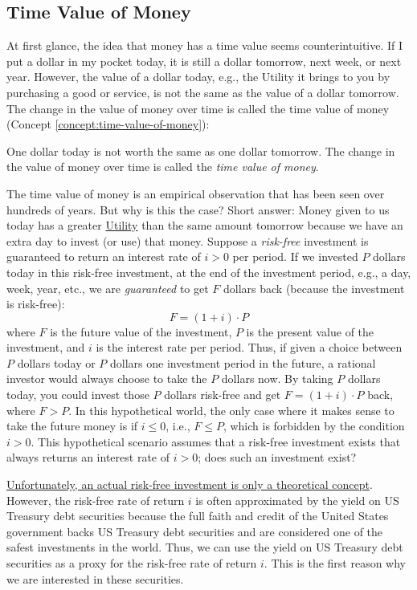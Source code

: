 \documentclass[11pt]{article}
\theoremstyle{definition}
\newcommand{\newterm}[1]{{\it #1}}
\begin{document}
\subsection{Time Value of Money}
At first glance, the idea that money has a time value seems counterintuitive. 
If I put a dollar in my pocket today, it is still a dollar tomorrow, next week, or next year. 
However, the value of a dollar today, e.g., the Utility it brings to you by purchasing a good or service, is not the same as the value of a dollar tomorrow.
The change in the value of money over time is called the time value of money (Concept \ref{concept:time-value-of-money}):
\begin{concept}\label{concept:time-value-of-money}
	One dollar today is not worth the same as one dollar tomorrow. 
	The change in the value of money over time is called the \newterm{time value of money}.
\end{concept}
The time value of money is an empirical observation that has been seen over hundreds of years. 
But why is this the case? Short answer: Money given to us today has a greater \href{https://en.wikipedia.org/wiki/Utility}{Utility} 
than the same amount tomorrow because we have an extra day to invest (or use) that money. Suppose a \emph{risk-free} investment is guaranteed to return an interest rate of $i>0$ per period.
If we invested $P$ dollars today in this risk-free investment, at the end of the investment period, e.g., a day, week, year, etc., 
we are \emph{guaranteed} to get $F$ dollars back (because the investment is risk-free):
\begin{equation*}
F = (1+i)\cdot{P}
\end{equation*}
where $F$ is the future value of the investment, $P$ is the present value of the investment, and $i$ is the interest rate per period.
Thus, if given a choice between $P$ dollars today or $P$ dollars one investment period in the future, 
a rational investor would always choose to take the $P$ dollars now. By taking $P$ dollars today, you could invest those $P$ dollars risk-free and get $F = (1+i)\cdot{P}$ back, where $F>P$. 
In this hypothetical world, the only case where it makes sense to take the future money is if $i\leq{0}$, i.e., $F\leq{P}$, which is forbidden by the condition $i>0$. 
This hypothetical scenario assumes that a risk-free investment exists that always returns an interest rate of $i>0$; 
does such an investment exist? 

\href{https://www.investopedia.com/terms/r/risk-freerate.asp}{Unfortunately, an actual risk-free investment is only a theoretical concept}. 
However, the risk-free rate of return $i$ is often approximated by the yield on US Treasury debt securities because the full faith and credit of the United States government backs US Treasury debt securities
and are considered one of the safest investments in the world. 
Thus, we can use the yield on US Treasury debt securities as a proxy for the risk-free rate of return $i$. 
This is the first reason why we are interested in these securities.
\end{document}
